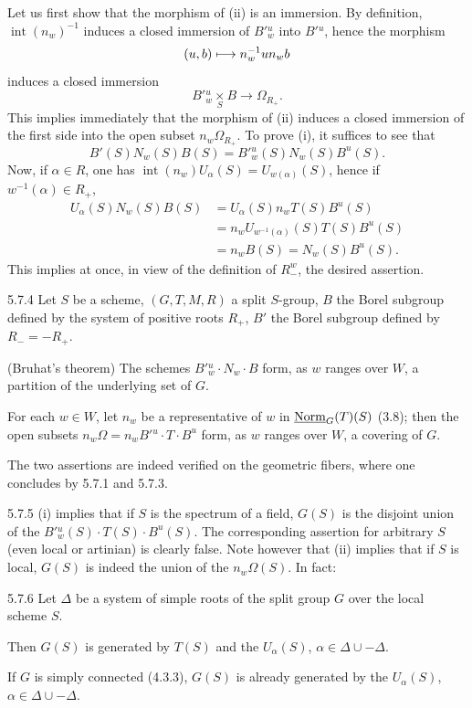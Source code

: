 Let us first show that the morphism of (ii) is an immersion. By definition, $\operatorname{int}(n_w)^{-1}$ induces a closed immersion of $B'{}^u_w$ into $B'{}^u$, hence the morphism
\[
(u,b)\longmapsto n_w^{-1}un_wb
\]
induces a closed immersion
\[
B'{}^u_w\underset S\times B\to\Omega_{R_+}.
\]
This implies immediately that the morphism of (ii) induces a closed immersion of the first side into the open subset $n_w\Omega_{R_+}$. To prove (i), it suffices to see that
\[
B'(S)N_w(S)B(S)=B'{}^u_w(S)N_w(S)B^u(S).
\]
Now, if $\alpha\in R$, one has $\operatorname{int}(n_w)U_\alpha(S)=U_{w(\alpha)}(S)$, hence if $w^{-1}(\alpha)\in R_+$,
\[
\begin{aligned}
U_\alpha(S)N_w(S)B(S)&=U_\alpha(S)n_wT(S)B^u(S)\\
&=n_wU_{w^{-1}(\alpha)}(S)T(S)B^u(S)\\
&=n_wB(S)=N_w(S)B^u(S).
\end{aligned}
\]
This implies at once, in view of the definition of $R_-^w$, the desired assertion.
\begin{theorem}{5.7.4}\label{XXII.5.7.4}
Let $S$ be a scheme, $(G,T,M,R)$ a split $S$-group, $B$ the Borel subgroup defined by the system of positive roots $R_+$, $B'$ the Borel subgroup defined by $R_-=-R_+$.
\begin{enumeratei}
\item (Bruhat's theorem) The schemes $B'{}^u_w\cdot N_w\cdot B$ form, as $w$ ranges over $W$, a partition of the underlying set of $G$.
\item For each $w\in W$, let $n_w$ be a representative of $w$ in $\underline{\mathrm{Norm}}_G(T)(S)$ (3.8); then the open subsets $n_w\Omega=n_wB'{}^u\cdot T\cdot B^u$ form, as $w$ ranges over $W$, a covering of $G$.
\end{enumeratei}
\end{theorem}
The two assertions are indeed verified on the geometric fibers, where one concludes by 5.7.1 and 5.7.3.
\begin{remark}{5.7.5}\label{XXII.5.7.5}
(i) implies that if $S$ is the spectrum of a field, $G(S)$ is the disjoint union of the $B'{}^u_w(S)\cdot T(S)\cdot B^u(S)$. The corresponding assertion for arbitrary $S$ (even local or artinian) is clearly false. Note however that (ii) implies that if $S$ is local, $G(S)$ is indeed the union of the $n_w\Omega(S)$. In fact:
\end{remark}
\begin{corollary}{5.7.6}\label{XXII.5.7.6}
Let $\Delta$ be a system of simple roots of the split group $G$ over the local scheme $S$.
\begin{enumeratei}
\item Then $G(S)$ is generated by $T(S)$ and the $U_\alpha(S)$, $\alpha\in\Delta\cup-\Delta$.
\item If $G$ is simply connected (4.3.3), $G(S)$ is already generated by the $U_\alpha(S)$, $\alpha\in\Delta\cup-\Delta$.
\end{enumeratei}
\end{corollary}

